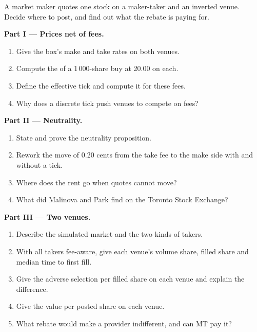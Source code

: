 \begin{problem}\label{pb:mx:fees-rebates-and-venue-economics:1}
A market maker quotes one stock on a maker-taker and an inverted venue. Decide where to post, and find out what the rebate is paying for.

\medskip\noindent\textbf{Part I --- Prices net of fees.}
\begin{enumerate}
\item Give the box's make and take rates on both venues.
\item Compute the  of a 1\,000-share buy at 20.00 on each.
\item Define the effective tick and compute it for these fees.
\item Why does a discrete tick push venues to compete on fees?
\end{enumerate}

\medskip\noindent\textbf{Part II --- Neutrality.}
\begin{enumerate}[resume]
\item State and prove the neutrality proposition.
\item Rework the move of 0.20 cents from the take fee to the make side with and without a tick.
\item Where does the rent go when quotes cannot move?
\item What did Malinova and Park find on the Toronto Stock Exchange?
\end{enumerate}

\medskip\noindent\textbf{Part III --- Two venues.}
\begin{enumerate}[resume]
\item Describe the simulated market and the two kinds of takers.
\item With all takers fee-aware, give each venue's volume share, filled share and median time to first fill.
\item Give the adverse selection per filled share on each venue and explain the difference.
\item Give the value per posted share on each venue.
\item What rebate would make a provider indifferent, and can MT pay it?
\end{enumerate}


\end{problem}
